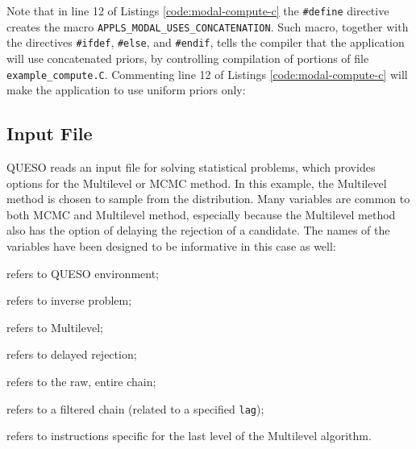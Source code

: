 




Note that in line 12 of Listings \ref{code:modal-compute-c} the \verb+#define+ directive creates the macro
 \linebreak
\verb+APPLS_MODAL_USES_CONCATENATION+. Such macro, together with the directives \verb+#ifdef+, \verb+#else+, and \verb+#endif+, tells the compiler that the application will use concatenated priors, by controlling compilation of portions of file \texttt{example\_compute.C}. Commenting line 12 of Listings \ref{code:modal-compute-c} will make the application to use uniform priors only:






\subsection{Input File}\label{sec:modal-input-file}


QUESO reads an input file for solving statistical problems, which provides options for the Multilevel or MCMC method. In this example, the Multilevel method is chosen to sample from the distribution. Many variables are common to both MCMC and Multilevel method, especially because the Multilevel method also has the option of delaying the rejection of a candidate. The names of the variables have been designed to be informative in this case as well:
\begin{description}\vspace{-8pt}
\item[ \texttt{env}:] refers to QUESO environment; \vspace{-8pt}
\item[ \texttt{ip}:] refers to inverse problem;\vspace{-8pt}
\item[ \texttt{ml}:] refers to Multilevel;\vspace{-8pt}
\item[ \texttt{dr}:] refers to delayed rejection;\vspace{-8pt}
\item[ \texttt{rawChain}:] refers to the raw, entire chain; \vspace{-8pt}
\item[ \texttt{filteredChain}:] refers to a filtered chain (related to a specified \texttt{lag});\vspace{-8pt}
\item[ \texttt{last}:] refers to instructions specific for the last level of the Multilevel algorithm.
\end{description}

